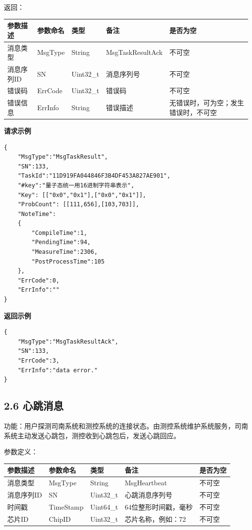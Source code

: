 \documentclass{ctexart}
\begin{document}
返回：

\begin{longtable}{|l|l|l|l|l|}
\hline
\textbf{\textbf{参数描述}} & \textbf{\textbf{参数命名}} & \textbf{\textbf{类型}} & \textbf{\textbf{备注}} & \textbf{\textbf{是否为空}} \\
\hline
消息类型 & MsgType & String & MsgTaskResultAck & 不可空 \\
消息序列ID & SN & Uint32_t & 消息序列号 & 不可空 \\
错误码 & ErrCode & Uint32_t & 错误码 & 不可空 \\
错误信息 & ErrInfo & String & 错误描述 & 无错误时，可为空；发生错误时，不可空 \\
\hline
\end{longtable}

\textbf{请求示例}

\begin{verbatim}{
    "MsgType":"MsgTaskResult",
    "SN":133,
    "TaskId":"11D919FA044846F3B4DF453A827AE901",
    "#key":"量子态统一用16进制字符串表示",
    "Key": [["0x0","0x1"],["0x0","0x1"]],
    "ProbCount": [[111,656],[103,703]],
    "NoteTime":
    {
        "CompileTime":1,
        "PendingTime":94,
        "MeasureTime":2306,
        "PostProcessTime":105
    },
    "ErrCode":0,
    "ErrInfo":""
}\end{verbatim}

\textbf{返回示例}

\begin{verbatim}{
    "MsgType":"MsgTaskResultAck",
    "SN":133,
    "ErrCode":3,
    "ErrInfo":"data error."
}\end{verbatim}

\subsection{2.6 心跳消息}

功能：用户探测司南系统和测控系统的连接状态。由测控系统维护系统服务，司南系统主动发送心跳包，测控收到心跳包后，发送心跳回应。

参数定义：

\begin{longtable}{|l|l|l|l|l|}
\hline
\textbf{\textbf{参数描述}} & \textbf{\textbf{参数命名}} & \textbf{\textbf{类型}} & \textbf{\textbf{备注}} & \textbf{\textbf{是否为空}} \\
\hline
消息类型 & MsgType & String & MsgHeartbeat & 不可空 \\
消息序列ID & SN & Uint32_t & 心跳消息序列号 & 不可空 \\
时间戳 & TimeStamp & Uint64_t & 64位整形时间戳，毫秒 & 不可空 \\
芯片ID & ChipID & Uint32_t & 芯片名称，例如：72 & 不可空 \\
\hline
\end{longtable}
\end{document}
